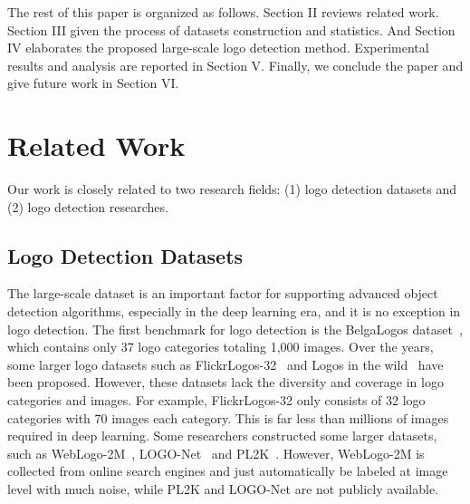 \documentclass[journal]{IEEEtran}
\begin{document}
The rest of this paper is organized as follows. Section II reviews related work. Section III given the process of datasets construction and statistics. And Section IV elaborates the proposed large-scale logo detection method. Experimental results and analysis are reported in Section V. Finally, we conclude the paper and give future work in Section VI.

\section{Related Work}
Our work is closely related to two research fields:  (1) logo detection datasets and (2) logo detection researches.
\subsection{Logo Detection Datasets}
The large-scale dataset is an important factor for supporting advanced object detection algorithms, especially in the deep learning era, and it is no exception in logo detection. The first benchmark for logo detection is the BelgaLogos dataset~\cite{Neumann2001Integration}, which contains only 37 logo categories totaling 1,000 images. Over the years, some larger logo datasets such as FlickrLogos-32~\cite{Romberg2011Scalable} and Logos in the wild~\cite{Andras2017Open} have been proposed. However, these datasets lack the diversity and coverage in logo categories and images. For example, FlickrLogos-32 only consists of 32 logo categories with 70 images each category. This is far less than millions of images required in deep learning. Some researchers constructed some larger datasets, such as WebLogo-2M~\cite{Su2017WebLogo}, LOGO-Net~\cite{Hoi2015LOGO} and PL2K~\cite{II2019Scalable}. However, WebLogo-2M is collected from online search engines and just automatically be labeled at image level with  much noise, while PL2K and LOGO-Net are not publicly available.
\end{document}
